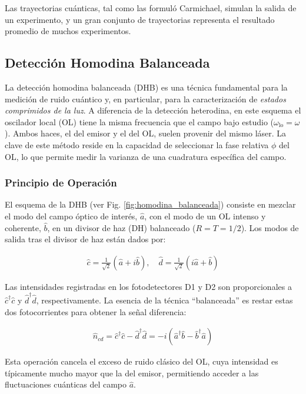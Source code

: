 \documentclass[12pt]{article}
\begin{document}
Las trayectorias cuánticas, tal como las formuló Carmichael, simulan la salida de un experimento, y un gran conjunto de trayectorias representa el resultado promedio de muchos experimentos.

\subsection{Detección Homodina Balanceada}

La detección homodina balanceada (DHB) es una técnica fundamental para la medición de ruido cuántico y, en particular, para la caracterización de \textit{estados comprimidos de la luz}. A diferencia de la detección heterodina, en este esquema el oscilador local (OL) tiene la misma frecuencia que el campo bajo estudio ($\omega_{\text{lo}} = \omega$). Ambos haces, el del emisor y el del OL, suelen provenir del mismo láser. La clave de este método reside en la capacidad de seleccionar la fase relativa $\phi$ del OL, lo que permite medir la varianza de una cuadratura específica del campo.

\subsubsection*{Principio de Operación}

El esquema de la DHB (ver Fig. \ref{fig:homodina_balanceada}) consiste en mezclar el modo del campo óptico de interés, $\hat{a}$, con el modo de un OL intenso y coherente, $\hat{b}$, en un divisor de haz (DH) balanceado ($R = T = 1/2$). Los modos de salida tras el divisor de haz están dados por:

\begin{eqnarray}
\hat{c} = \frac{1}{\sqrt{2}} (\hat{a} + i\hat{b}), \quad
\hat{d} = \frac{1}{\sqrt{2}} (i\hat{a} + \hat{b})
\end{eqnarray}

Las intensidades registradas en los fotodetectores D1 y D2 son proporcionales a $\hat{c}^\dagger \hat{c}$ y $\hat{d}^\dagger \hat{d}$, respectivamente. La esencia de la técnica ``balanceada'' es restar estas dos fotocorrientes para obtener la señal diferencia:

\begin{eqnarray}
\hat{n}_{cd} = \hat{c}^\dagger \hat{c} - \hat{d}^\dagger \hat{d} = -i(\hat{a}^\dagger \hat{b} - \hat{b}^\dagger \hat{a})
\label{eq:diferencia_corrientes}
\end{eqnarray}

Esta operación cancela el exceso de ruido clásico del OL, cuya intensidad es típicamente mucho mayor que la del emisor, permitiendo acceder a las fluctuaciones cuánticas del campo $\hat{a}$.
\end{document}
